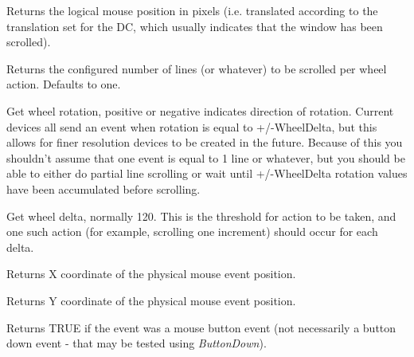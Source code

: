 Returns the logical mouse position in pixels (i.e. translated according to the
translation set for the DC, which usually indicates that the window has been scrolled).


\label{wxmouseeventgetlinesperaction}


Returns the configured number of lines (or whatever) to be scrolled per
wheel action.  Defaults to one.

\label{wxmouseeventgetwheelrotation}


Get wheel rotation, positive or negative indicates direction of
rotation.  Current devices all send an event when rotation is equal to
+/-WheelDelta, but this allows for finer resolution devices to be
created in the future.  Because of this you shouldn't assume that one
event is equal to 1 line or whatever, but you should be able to either
do partial line scrolling or wait until +/-WheelDelta rotation values
have been accumulated before scrolling.

\label{wxmouseeventgetwheeldelta}


Get wheel delta, normally 120.  This is the threshold for action to be
taken, and one such action (for example, scrolling one increment)
should occur for each delta.

\label{wxmouseeventgetx}


Returns X coordinate of the physical mouse event position.

\label{wxmouseeventgety}


Returns Y coordinate of the physical mouse event position.



Returns TRUE if the event was a mouse button event (not necessarily a button down event -
that may be tested using {\it ButtonDown}).

\label{wxmouseeventleaving}

